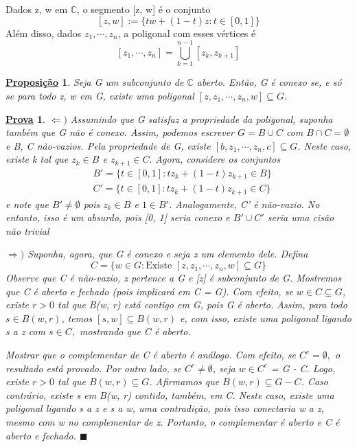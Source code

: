 \documentclass{article}
\newtheorem*{proof*}{\underline{Prova}}
\newtheorem*{prop*}{\underline{Proposi\c c\~ao}}
\renewcommand\qedsymbol{$\blacksquare$}
\begin{document}
  Dados z, w em $\mathbb{C}$, o segmento [z, w] \'e o conjunto
  $$
  [z, w]:= \{tw + (1-t)z: t\in[0, 1]\}
  $$
  Al\'em disso, dados $z _{1}, \cdots, z _{n}$, a poligonal com esses v\'ertices \'e
  $$
  [z _{1}, \cdots, z _{n}] = \bigcup _{k=1}^{n-1}[z _{k}, z _{k+1}]
  $$
 \begin{prop*}
   Seja G um subconjunto de $\mathbb{C}$ aberto. Ent\~ao, G \'e conexo se, e s\'o se para todo z, w em G, existe uma poligonal
  $[z, z _{1}, \cdots, z _{n}, w]\subseteq{G}.$
 \end{prop*}
\begin{proof*}
  $\Leftarrow)$ Assumindo que G satisfaz a propriedade da poligonal, suponha tamb\'em que G n\~ao \'e conexo. Assim,
podemos escrever $G = B\cup{C}$ com $B\cap{C}=\emptyset$ e B, C n\~ao-vazios. Pela propriedade de G, existe 
  $[b, z _{1}, \cdots, z _{n}, c]\subseteq{G}$. Neste caso, existe k tal que $z _{k}\in{B}$ e $z _{k+1}\in{C}.$ Agora,
  considere os conjuntos 
 \begin{align*}
   &B' = \{t\in[0, 1]: tz _{k} + (1 - t)z _{k+1}\in{B}\}\\
   &C' = \{t\in[0, 1]: tz _{k} + (1 - t)z _{k+1}\in{C}\}
 \end{align*}
e note que $B'\neq{\emptyset}$ pois $z _{k}\in{B}$ e $1\in{B'}$. Analogamente, C' \'e n\~ao-vazio. No entanto, isso \'e um absurdo,
pois [0, 1] seria conexo e $B'\cup{C'}$ seria uma cis\~ao n\~ao trivial

 $\Rightarrow)$ Suponha, agora, que G \'e conexo e seja z um elemento dele. Defina 
 $$
 C = \{w\in{G}: \text{Existe } [z, z _{1}, \cdots, z _{n}, w]\subseteq{G}\}
 $$
 Observe que C \'e n\~ao-vazio, z pertence a G e [z] \'e subconjunto de G. Mostremos que C \'e aberto e fechado (pois implicar\'a em C = G).
Com efeito, se $w\in{C}\subseteq{G}$, existe $r>0$ tal que B(w, r) est\'a contigo em G, pois G \'e aberto.
 Assim, para todo $s\in B(w, r)$, temos $[s, w]\subseteq{B(w, r)}$ e, com isso, existe uma poligonal ligando s a z com $s\in{C},$ mostrando 
que C \'e aberto.

  Mostrar que o complementar de C \'e aberto \'e an\'alogo. Com efeito, se $C ^{c} = \emptyset,$ o resultado est\'a provado. Por outro
lado, se $C ^{c}\neq\emptyset$, seja $w\in{C ^{c}}$ = G - C. Logo, existe $r > 0$ tal que $B(w, r)\subseteq{G}$. Afirmamos
que $B(w, r)\subseteq{G-C}$. Caso contr\'ario, existe s em B(w, r) contido, tamb\'em, em C. Neste caso, existe uma poligonal
ligando s a z e s a w, uma contradi\c c\~ao, pois isso conectaria w a z, mesmo com w no complementar de z. Portanto, o complementar
\'e aberto e C \'e aberto e fechado. \qedsymbol
\end{proof*}
\end{document}
